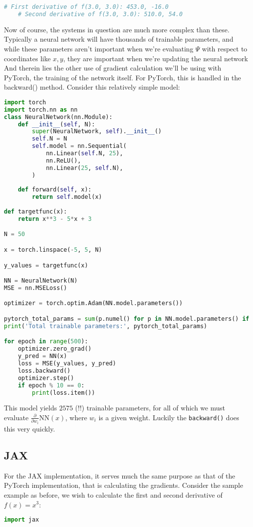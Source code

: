 \documentclass[12pt]{article}
\begin{document}
{\begin{lstlisting}[language=Python]
    # First derivative of f(3.0, 3.0): 453.0, -16.0
    # Second derivative of f(3.0, 3.0): 510.0, 54.0
\end{lstlisting}
Now of course, the systems in question are much more complex than these. Typically a neural network will have thousands of trainable parameters, and while these parameters aren't important when we're evaluating $\Psi$ with respect to coordinates like $x, y$, they are important when we're updating the neural network
\newline
And therein lies the other use of gradient calculation we'll be using with PyTorch, the training of the network itself.
\newpage
For PyTorch, this is handled in the backward() method. Consider this relatively simple model:
\begin{lstlisting}[language=Python]
import torch
import torch.nn as nn
class NeuralNetwork(nn.Module):
    def __init__(self, N):
        super(NeuralNetwork, self).__init__()
        self.N = N
        self.model = nn.Sequential(
            nn.Linear(self.N, 25),
            nn.ReLU(),
            nn.Linear(25, self.N),
        )
 
    def forward(self, x):
        return self.model(x)
    
def targetfunc(x):
    return x**3 - 5*x + 3 

N = 50

x = torch.linspace(-5, 5, N)

y_values = targetfunc(x)

NN = NeuralNetwork(N)
MSE = nn.MSELoss()

optimizer = torch.optim.Adam(NN.model.parameters())

pytorch_total_params = sum(p.numel() for p in NN.model.parameters() if p.requires_grad)
print('Total trainable parameters:', pytorch_total_params)

for epoch in range(500):
    optimizer.zero_grad()
    y_pred = NN(x)
    loss = MSE(y_values, y_pred)
    loss.backward()
    optimizer.step()
    if epoch % 10 == 0:
        print(loss.item())
\end{lstlisting}

This model yields $2575$ (!!) trainable parameters, for all of which we must evaluate $\frac{\partial}{\partial w_i}\text{NN}(x)$, where $w_i$ is a given weight. Luckily the \texttt{backward()} does this very quickly.
\subsection{JAX} \label{Jax}
For the JAX implementation, it serves much the same purpose as that of the PyTorch implementation, that is calculating the gradients. Consider the sample example as before, we wish to calculate the first and second derivative of $f(x) = x^3$:
\begin{lstlisting}[language=Python]
    import jax


\end{lstlisting}}
\end{document}
